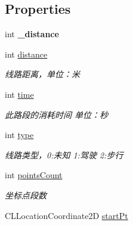 \subsection*{Properties}
\begin{DoxyCompactItemize}
\item 
\hypertarget{interface_b_m_k_route_a811a96fafd8ebfde05e6f80ac05c5e76}{int {\bfseries \-\_\-distance}}\label{interface_b_m_k_route_a811a96fafd8ebfde05e6f80ac05c5e76}

\item 
\hypertarget{interface_b_m_k_route_ab8c229e762a5d840a82bf3736c8f571d}{int \hyperlink{interface_b_m_k_route_ab8c229e762a5d840a82bf3736c8f571d}{distance}}\label{interface_b_m_k_route_ab8c229e762a5d840a82bf3736c8f571d}

\begin{DoxyCompactList}\small\item\em 线路距离，单位：米 \end{DoxyCompactList}\item 
\hypertarget{interface_b_m_k_route_a221b591dda34baae8bcc689d9eeabb22}{int \hyperlink{interface_b_m_k_route_a221b591dda34baae8bcc689d9eeabb22}{time}}\label{interface_b_m_k_route_a221b591dda34baae8bcc689d9eeabb22}

\begin{DoxyCompactList}\small\item\em 此路段的消耗时间 单位：秒 \end{DoxyCompactList}\item 
\hypertarget{interface_b_m_k_route_a121de8965846b3bf42fd5ea106804c36}{int \hyperlink{interface_b_m_k_route_a121de8965846b3bf42fd5ea106804c36}{type}}\label{interface_b_m_k_route_a121de8965846b3bf42fd5ea106804c36}

\begin{DoxyCompactList}\small\item\em 线路类型，0\-:未知 1\-:驾驶 2\-:步行 \end{DoxyCompactList}\item 
\hypertarget{interface_b_m_k_route_a1598a86af26f5bbc44ae5cb787ed14a6}{int \hyperlink{interface_b_m_k_route_a1598a86af26f5bbc44ae5cb787ed14a6}{points\-Count}}\label{interface_b_m_k_route_a1598a86af26f5bbc44ae5cb787ed14a6}

\begin{DoxyCompactList}\small\item\em 坐标点段数 \end{DoxyCompactList}\item 
\hypertarget{interface_b_m_k_route_a9551046aeaa18a2d2d269186c1417ab5}{C\-L\-Location\-Coordinate2\-D \hyperlink{interface_b_m_k_route_a9551046aeaa18a2d2d269186c1417ab5}{start\-Pt}}\label{interface_b_m_k_route_a9551046aeaa18a2d2d269186c1417ab5}


\end{DoxyCompactItemize}
